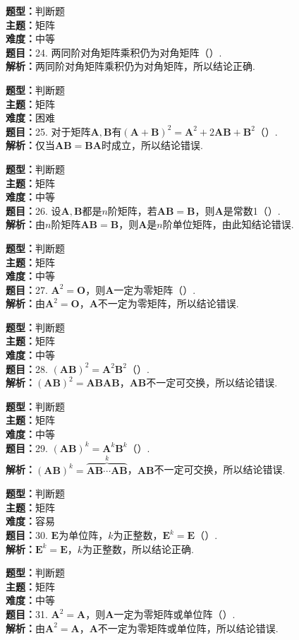\documentclass{ctexart}
\newenvironment{question}[5]{%
	\noindent\textbf{题型：}#1\\
	\textbf{主题：}#2\\
	\textbf{难度：}#3\\
	\textbf{题目：}#4\\
	\textbf{解析：}#5\\
	\vspace{1em}
}{}
\begin{document}
	\begin{question}
		{判断题}
		{矩阵}
		{中等}
		{24. 两同阶对角矩阵乘积仍为对角矩阵（）.}
		{两同阶对角矩阵乘积仍为对角矩阵，所以结论正确.}
	\end{question}
	
	\begin{question}
		{判断题}
		{矩阵}
		{困难}
		{25. 对于矩阵\(\mathbf{A}, \mathbf{B}\)有\((\mathbf{A}+\mathbf{B})^2=\mathbf{A}^2+2\mathbf{AB}+\mathbf{B}^2\)（）.}
		{仅当\(\mathbf{AB}=\mathbf{BA}\)时成立，所以结论错误.}
	\end{question}
	
	
	\begin{question}
		{判断题}
		{矩阵}
		{中等}
		{26. 设\(\mathbf{A},\mathbf{B}\)都是\(n\)阶矩阵，若\(\mathbf{AB}=\mathbf{B}\)，则\(\mathbf{A}\)是常数1（）.}
		{由\(n\)阶矩阵\(\mathbf{AB}=\mathbf{B}\)，则\(\mathbf{A}\)是\(n\)阶单位矩阵，由此知结论错误.}
	\end{question}
	
	\begin{question}
		{判断题}
		{矩阵}
		{中等}
		{27. \(\mathbf{A}^2=\mathbf{O}\)，则\(\mathbf{A}\)一定为零矩阵（）.}
		{由\(\mathbf{A}^2=\mathbf{O}\)，\(\mathbf{A}\)不一定为零矩阵，所以结论错误.}
	\end{question}
	
	\begin{question}
		{判断题}
		{矩阵}
		{中等}
		{28. \((\mathbf{AB})^2=\mathbf{A}^2\mathbf{B}^2\)（）.}
		{\((\mathbf{AB})^2=\mathbf{ABAB}\)，\(\mathbf{AB}\)不一定可交换，所以结论错误.}
	\end{question}
	
	\begin{question}
		{判断题}
		{矩阵}
		{中等}
		{29. \((\mathbf{AB})^k=\mathbf{A}^k\mathbf{B}^k\)（）.}
		{\((\mathbf{AB})^k=\overbrace{\mathbf{AB}\cdots\mathbf{AB}}^k\)，\(\mathbf{AB}\)不一定可交换，所以结论错误.}
	\end{question}
	
	\begin{question}
		{判断题}
		{矩阵}
		{容易}
		{30. \(\mathbf{E}\)为单位阵，\(k\)为正整数，\(\mathbf{E}^k=\mathbf{E}\)（）.}
		{\(\mathbf{E}^k=\mathbf{E}\)，\(k\)为正整数，所以结论正确.}
	\end{question}
	
	\begin{question}
		{判断题}
		{矩阵}
		{中等}
		{31. \(\mathbf{A}^2=\mathbf{A}\)，则\(\mathbf{A}\)一定为零矩阵或单位阵（）.}
		{由\(\mathbf{A}^2=\mathbf{A}\)，\(\mathbf{A}\)不一定为零矩阵或单位阵，所以结论错误.}
	\end{question}
	
\end{document}
